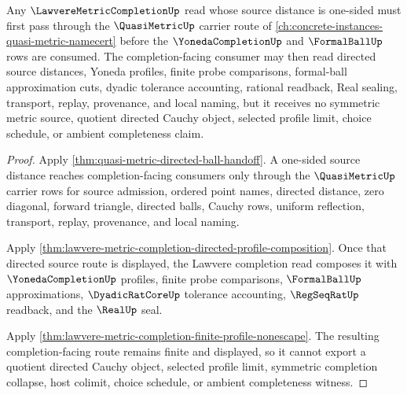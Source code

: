 \begin{theorem}
\label{thm:lawvere-metric-completion-quasi-metric-source-handoff}
Any $\LawvereMetricCompletionUp$ read whose source distance is one-sided must first pass through the $\QuasiMetricUp$ carrier route of \autoref{ch:concrete-instances-quasi-metric-namecert} before the $\YonedaCompletionUp$ and $\FormalBallUp$ rows are consumed. The completion-facing consumer may then read directed source distances, Yoneda profiles, finite probe comparisons, formal-ball approximation cuts, dyadic tolerance accounting, rational readback, Real sealing, transport, replay, provenance, and local naming, but it receives no symmetric metric source, quotient directed Cauchy object, selected profile limit, choice schedule, or ambient completeness claim.
\end{theorem}
\begin{proof}
Apply \autoref{thm:quasi-metric-directed-ball-handoff}. A one-sided source distance reaches completion-facing consumers only through the $\QuasiMetricUp$ carrier rows for source admission, ordered point names, directed distance, zero diagonal, forward triangle, directed balls, Cauchy rows, uniform reflection, transport, replay, provenance, and local naming.

Apply \autoref{thm:lawvere-metric-completion-directed-profile-composition}. Once that directed source route is displayed, the Lawvere completion read composes it with $\YonedaCompletionUp$ profiles, finite probe comparisons, $\FormalBallUp$ approximations, $\DyadicRatCoreUp$ tolerance accounting, $\RegSeqRatUp$ readback, and the $\RealUp$ seal.

Apply \autoref{thm:lawvere-metric-completion-finite-profile-nonescape}. The resulting completion-facing route remains finite and displayed, so it cannot export a quotient directed Cauchy object, selected profile limit, symmetric completion collapse, host colimit, choice schedule, or ambient completeness witness.
\end{proof}

